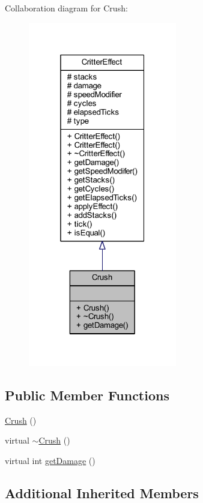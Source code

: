 Collaboration diagram for Crush\+:\nopagebreak
\begin{figure}[H]
\begin{center}
\leavevmode
\includegraphics[width=184pt]{struct_crush__coll__graph}
\end{center}
\end{figure}
\subsection*{Public Member Functions}
\begin{DoxyCompactItemize}
\item 
\hyperlink{struct_crush_a09bea4783bddac1b22881b1cd72c45a1}{Crush} ()
\item 
virtual \hyperlink{struct_crush_a12561d6e9c10359ed031ec6d91a40be9}{$\sim$\+Crush} ()
\item 
virtual int \hyperlink{struct_crush_a269885cd9bf52fbf5af8b0f9778e0330}{get\+Damage} ()
\end{DoxyCompactItemize}
\subsection*{Additional Inherited Members}


